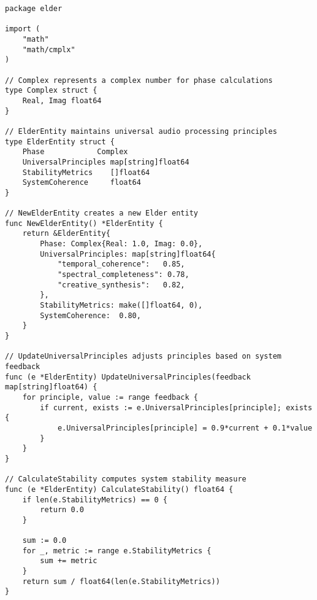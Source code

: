 \begin{tcolorbox}[colback=CodeBackground, colframe=DarkGray, title=Elder Entity Implementation, fonttitle=\bfseries]
\begin{verbatim}
package elder

import (
    "math"
    "math/cmplx"
)

// Complex represents a complex number for phase calculations
type Complex struct {
    Real, Imag float64
}

// ElderEntity maintains universal audio processing principles
type ElderEntity struct {
    Phase            Complex
    UniversalPrinciples map[string]float64
    StabilityMetrics    []float64
    SystemCoherence     float64
}

// NewElderEntity creates a new Elder entity
func NewElderEntity() *ElderEntity {
    return &ElderEntity{
        Phase: Complex{Real: 1.0, Imag: 0.0},
        UniversalPrinciples: map[string]float64{
            "temporal_coherence":   0.85,
            "spectral_completeness": 0.78,
            "creative_synthesis":   0.82,
        },
        StabilityMetrics: make([]float64, 0),
        SystemCoherence:  0.80,
    }
}

// UpdateUniversalPrinciples adjusts principles based on system feedback
func (e *ElderEntity) UpdateUniversalPrinciples(feedback map[string]float64) {
    for principle, value := range feedback {
        if current, exists := e.UniversalPrinciples[principle]; exists {
            e.UniversalPrinciples[principle] = 0.9*current + 0.1*value
        }
    }
}

// CalculateStability computes system stability measure
func (e *ElderEntity) CalculateStability() float64 {
    if len(e.StabilityMetrics) == 0 {
        return 0.0
    }
    
    sum := 0.0
    for _, metric := range e.StabilityMetrics {
        sum += metric
    }
    return sum / float64(len(e.StabilityMetrics))
}
\end{verbatim}
\end{tcolorbox}

